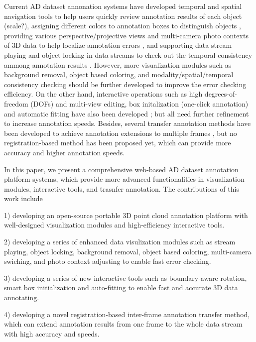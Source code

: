 \documentclass[letterpaper, 10 pt, conference]{ieeeconf}  %
\begin{document}
Current AD dataset annonation systems have developed temporal and spatial navigation tools to help users quickly review annotation results of each object  \cite{Playment,SUPERVISELY,Wang2019LATTEAL,Zimmer20193DBA}(scale?), assigning different colors to annotation boxes to distinguish objects \cite{SUPERVISELY,Zimmer20193DBA,Playment,scale}, providing various perspective/projective views and multi-camera photo contexts of 3D data to help localize annotation errors \cite{SUPERVISELY,Playment,Zimmer20193DBA}, and supporting data stream playing and object locking in data streams to check out the temporal consistency ammong annotation results \cite{Playment}. However,  more visualization modules such as background removal, object based coloring, and modality/spatial/temporal consistency checking should be further developed to improve the error checking efficiency. On the other hand, interactive operations such as high degrees-of-freedom (DOFs) and multi-view editing, box initalization (one-click annotation) and automatic fitting have also been developed \cite{pointatme,Zimmer20193DBA,Wang2019LATTEAL,SUPERVISELY,Playment}; but all need further refinement to increase annotation speeds.  Besides, several transfer annotation methods have been developed to achieve annotation extensions to multiple frames \cite{Playment,Wang2019LATTEAL,Zimmer20193DBA}, but no registration-based method has been proposed yet, which can provide more accuracy and higher annotation speeds.


In this paper, we present a comprehensive web-based AD dataset annotation platform systems, which provide more advanced functionalities in visualization modules, interactive tools, and trasnfer annotation. The contributions of this work include

1) developing an open-source portable 3D point cloud annotation platform with well-designed visualization modules and high-efficiency interactive tools.

2) developing a series of enhanced data visulization modules such as stream playing, object locking, background removal, object based coloring, multi-camera swiching, and photo context adjusting to enable fast error checking.

3) developing a series of new interactive tools such as boundary-aware rotation, smart box initialization and auto-fitting to enable fast and accurate 3D data annotating.

4) developing a novel registration-based inter-frame annotation transfer method, which can extend annotation results from one frame to the whole data stream with high accuracy and speeds.
\end{document}
